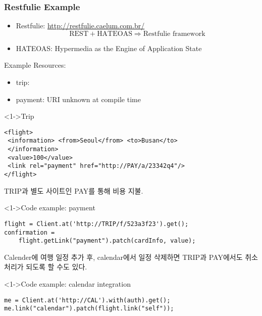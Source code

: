 \begin{frame}
\frametitle{Restfulie Example}

\begin{itemize}
\item Restfulie: \url{http://restfulie.caelum.com.br/}
\[
\mbox{REST} + \mbox{HATEOAS} \Rightarrow \mbox{Restfulie framework}
\]
\item HATEOAS: Hypermedia as the Engine of Application State
\end{itemize}

Example Resources:
\begin{itemize}
    \item trip: 
    \item payment: URI unknown at compile time
\end{itemize}

\begin{block}<1->{Trip}
\lstset{basicstyle=\ttfamily\small,language=xml}
\begin{lstlisting}
<flight>
 <information> <from>Seoul</from> <to>Busan</to> 
 </information>
 <value>100</value>
 <link rel="payment" href="http://PAY/a/23342q4"/>
</flight>
\end{lstlisting}
\end{block}

\pagebreak

TRIP과 별도 사이트인 PAY를 통해 비용 지불.

\begin{block}<1->{Code example: payment}
\lstset{basicstyle=\ttfamily\small,language=java}
\begin{lstlisting}
flight = Client.at('http://TRIP/f/523a3f23').get();
confirmation = 
    flight.getLink("payment").patch(cardInfo, value);
\end{lstlisting}
\end{block}

Calender에 여행 일정 추가 후, calendar에서 일정 삭제하면 TRIP과 PAY에서도 
취소 처리가 되도록 할 수도 있다.

\begin{block}<1->{Code example: calendar integration}
\lstset{basicstyle=\ttfamily\small,language=java}
\begin{lstlisting}
me = Client.at('http://CAL').with(auth).get();
me.link("calendar").patch(flight.link("self"));
\end{lstlisting}
\end{block}


\end{frame}

